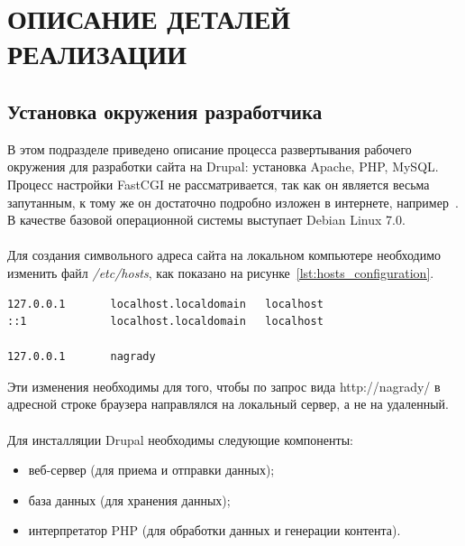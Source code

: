 \section[Описание деталей реализации]{ОПИСАНИЕ ДЕТАЛЕЙ РЕАЛИЗАЦИИ}
\label{sec:realization}

\subsection{Установка окружения разработчика}
\label{ssec:dev_installation}

В этом подразделе приведено описание процесса развертывания рабочего окружения 
для разработки сайта на Drupal: установка Apache, PHP, MySQL.
Процесс настройки FastCGI не рассматривается, так как он является
весьма запутанным, к тому же он достаточно подробно изложен в
интернете, например~\cite{fast_cgi_conf}.
В качестве базовой операционной системы выступает Debian Linux 7.0. 

\paragraph{}
Для создания символьного адреса сайта на локальном компьютере
необходимо изменить файл \textit{/etc/hosts}, как показано на рисунке~\ref{lst:hosts_configuration}.

\begin{lstlisting}[language=bash,
  caption=Содержимое файла \textit{/etc/hosts},
  label=lst:hosts_configuration]
127.0.0.1       localhost.localdomain   localhost
::1             localhost.localdomain   localhost

127.0.0.1       nagrady
\end{lstlisting}

Эти изменения необходимы для того, чтобы по запрос вида http://nagrady/
в адресной строке браузера направлялся на локальный сервер, а не на удаленный.

\paragraph{}
Для инсталляции Drupal необходимы следующие компоненты:

\begin{itemize}
\item
  веб-сервер (для приема и отправки данных);
\item
  база данных (для хранения данных);
\item
  интерпретатор PHP (для обработки данных и генерации контента).
\end{itemize}

